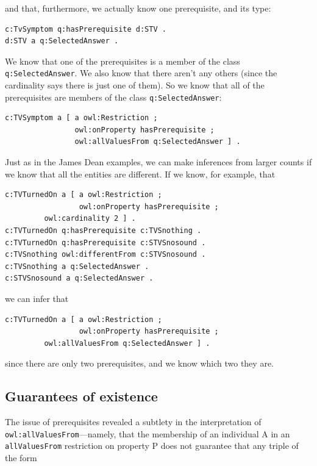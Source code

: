and that, furthermore, we actually know one prerequisite, and its type:

\begin{lstlisting}
c:TvSymptom q:hasPrerequisite d:STV .
d:STV a q:SelectedAnswer .
\end{lstlisting}

We know that one of the prerequisites is a member of the class
\texttt{q:SelectedAnswer}. We also know that there aren't any others (since the
cardinality says there is just one of them). So we know that all of the
prerequisites are members of the class \texttt{q:SelectedAnswer}:

\begin{lstlisting}
c:TVSymptom a [ a owl:Restriction ;
                owl:onProperty hasPrerequisite ;
                owl:allValuesFrom q:SelectedAnswer ] .
\end{lstlisting}

Just as in the James Dean examples, we can make inferences from larger
counts if we know that all the entities are different. If we know, for
example, that

\begin{lstlisting}
c:TVTurnedOn a [ a owl:Restriction ;
                 owl:onProperty hasPrerequisite ;
		 owl:cardinality 2 ] .
c:TVTurnedOn q:hasPrerequisite c:TVSnothing .
c:TVTurnedOn q:hasPrerequisite c:STVSnosound .
c:TVSnothing owl:differentFrom c:STVSnosound .
c:TVSnothing a q:SelectedAnswer .
c:STVSnosound a q:SelectedAnswer .
\end{lstlisting}

we can infer that

\begin{lstlisting}
c:TVTurnedOn a [ a owl:Restriction ;
                 owl:onProperty hasPrerequisite ;
		 owl:allValuesFrom q:SelectedAnswer ] .
\end{lstlisting}

since there are only two prerequisites, and we know which two they are.

\subsection{Guarantees of existence}

The issue of prerequisites revealed a subtlety in the interpretation of
\texttt{owl:allValuesFrom}---namely, that the membership of an individual A in an
\texttt{allValuesFrom} restriction on property P does not guarantee that any
triple of the form

